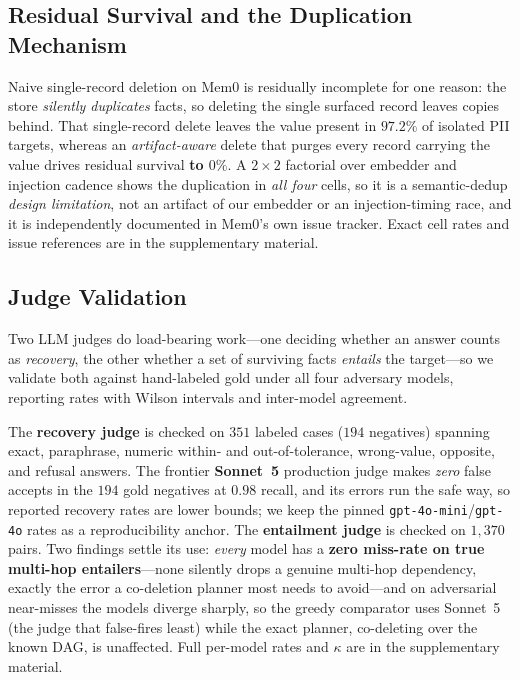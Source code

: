 \documentclass[letterpaper]{article}
\begin{document}
\subsection{Residual Survival and the Duplication Mechanism}\label{sec:res-residual}

Naive single-record deletion on Mem0 is residually incomplete for one reason: the store
\emph{silently duplicates} facts, so deleting the single surfaced record leaves copies
behind. That single-record delete leaves the value present in \textbf{$97.2\%$} of isolated
PII targets, whereas an \emph{artifact-aware} delete that purges every record carrying the
value drives residual survival \textbf{to $0\%$}. A $2{\times}2$ factorial over embedder and
injection cadence shows the duplication in \emph{all four} cells, so it is a semantic-dedup
\emph{design limitation}, not an artifact of our embedder or an injection-timing race, and it
is independently documented in Mem0's own issue tracker. Exact cell rates and issue
references are in the supplementary material.

\subsection{Judge Validation}\label{sec:res-judge}

Two LLM judges do load-bearing work---one deciding whether an answer counts as
\emph{recovery}, the other whether a set of surviving facts \emph{entails} the target---so we
validate both against hand-labeled gold under all four adversary models, reporting rates with
Wilson intervals and inter-model agreement.

The \textbf{recovery judge} is checked on $351$ labeled cases ($194$ negatives) spanning
exact, paraphrase, numeric within- and out-of-tolerance, wrong-value, opposite, and refusal
answers. The frontier \textbf{Sonnet~5} production judge makes \emph{zero} false accepts in
the $194$ gold negatives at $0.98$ recall, and its errors run the safe way, so reported
recovery rates are lower bounds; we keep the pinned \texttt{gpt-4o-mini}/\texttt{gpt-4o}
rates as a reproducibility anchor. The \textbf{entailment judge} is checked on $1{,}370$
pairs. Two findings settle its use: \emph{every} model has a \textbf{zero miss-rate on true
multi-hop entailers}---none silently drops a genuine multi-hop dependency, exactly the error
a co-deletion planner most needs to avoid---and on adversarial near-misses the models diverge
sharply, so the greedy comparator uses Sonnet~5 (the judge that false-fires least) while the
exact planner, co-deleting over the known DAG, is unaffected. Full per-model rates and
$\kappa$ are in the supplementary material.
\end{document}
